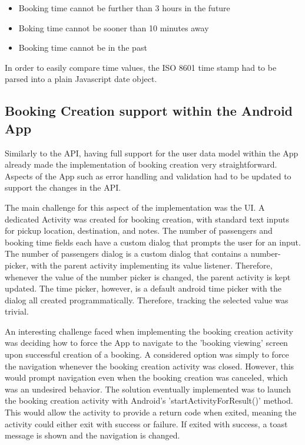 \begin{itemize}
	\item Booking time cannot be further than 3 hours in the future
	\item Boking time cannot be sooner than 10 minutes away
	\item Booking time cannot be in the past
\end{itemize}

In order to easily compare time values, the ISO 8601 time stamp had to be parsed into a plain Javascript date object.

\subsection{Booking Creation support within the Android App}
Similarly to the API, having full support for the user data model within the App already made the implementation of booking creation very straightforward. Aspects of the App such as error handling and validation had to be updated to support the changes in the API.

The main challenge for this aspect of the implementation was the UI. A dedicated Activity was created for booking creation, with standard text inputs for pickup location, destination, and notes. The number of passengers and booking time fields each have a custom dialog that prompts the user for an input. The number of passengers dialog is a custom dialog that contains a number-picker, with the parent activity implementing its value listener. Therefore, whenever the value of the number picker is changed, the parent activity is kept updated. The time picker, however, is a default android time picker with the dialog all created programmatically. Therefore, tracking the selected value was trivial.

An interesting challenge faced when implementing the booking creation activity was deciding how to force the App to navigate to the 'booking viewing' screen upon successful creation of a booking. A considered option was simply to force the navigation whenever the booking creation activity was closed. However, this would prompt navigation even when the booking creation was canceled, which was an undesired behavior. The solution eventually implemented was to launch the booking creation activity with Android's 'startActivityForResult()' method. This would allow the activity to provide a return code when exited, meaning the activity could either exit with success or failure. If exited with success, a toast message is shown and the navigation is changed.

